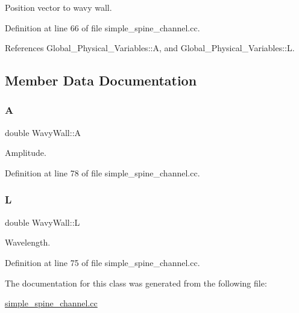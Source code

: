 Position vector to wavy wall. 



Definition at line 66 of file simple\+\_\+spine\+\_\+channel.\+cc.



References Global\+\_\+\+Physical\+\_\+\+Variables\+::A, and Global\+\_\+\+Physical\+\_\+\+Variables\+::L.



\subsection{Member Data Documentation}
\mbox{\label{classWavyWall_a435f0fb4db45b51eb371b66b244c7630}} 
\subsubsection{\texorpdfstring{A}{A}}
{\footnotesize\ttfamily double Wavy\+Wall\+::A\hspace{0.3cm}{\ttfamily [protected]}}



Amplitude. 



Definition at line 78 of file simple\+\_\+spine\+\_\+channel.\+cc.

\mbox{\label{classWavyWall_a598b42ece2600db9eb8c4d1dfeca9ad1}} 
\subsubsection{\texorpdfstring{L}{L}}
{\footnotesize\ttfamily double Wavy\+Wall\+::L\hspace{0.3cm}{\ttfamily [protected]}}



Wavelength. 



Definition at line 75 of file simple\+\_\+spine\+\_\+channel.\+cc.



The documentation for this class was generated from the following file\+:\begin{DoxyCompactItemize}
\item 
\hyperlink{simple__spine__channel_8cc}{simple\+\_\+spine\+\_\+channel.\+cc}\end{DoxyCompactItemize}
